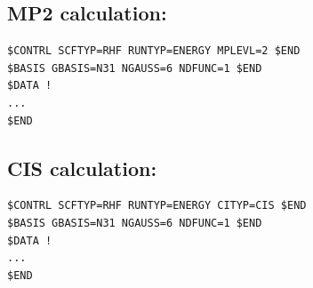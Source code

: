 \documentclass[11pt]{article}
\begin{document}
\subsection{MP2 calculation:}
\label{sec-5-4}

\begin{verbatim}
$CONTRL SCFTYP=RHF RUNTYP=ENERGY MPLEVL=2 $END 
$BASIS GBASIS=N31 NGAUSS=6 NDFUNC=1 $END
$DATA !
...
$END
\end{verbatim}


\subsection{CIS calculation:}
\label{sec-5-5}

\begin{verbatim}
$CONTRL SCFTYP=RHF RUNTYP=ENERGY CITYP=CIS $END 
$BASIS GBASIS=N31 NGAUSS=6 NDFUNC=1 $END
$DATA !
...
$END
\end{verbatim}
\end{document}
